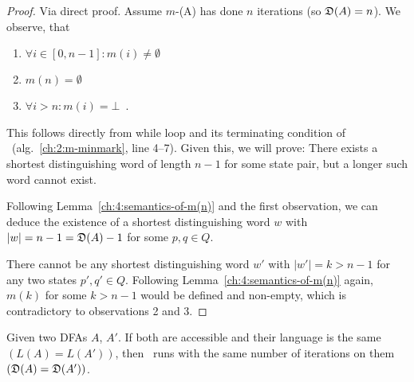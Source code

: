 \begin{proof}
	Via direct proof. Assume $m$-\CompDist(A) has done $n$ iterations (so $\mathfrak{D}(A) = n$). We observe, that
	\begin{enumerate}
		\item $\forall i \in [0,n-1]\colon m(i) \neq \emptyset$
		\item $m(n)= \emptyset$
		\item $\forall i > n\colon m(i)= \bot$\ .
	\end{enumerate}
	This follows directly from while loop and its terminating condition of \CompDist\ (alg.~\ref{ch:2:m-minmark}, line 4--7). Given this, we will prove: There exists a shortest distinguishing word of length $n-1$ for some state pair, but a longer such word cannot exist.

	
	Following Lemma~\ref{ch:4:semantics-of-m(n)} and the first observation, we can deduce the existence of a shortest distinguishing word $w$ with $|w| = n-1 = \mathfrak{D}(A)-1$ for some $p,q \in Q$.
	
	
	There cannot be any shortest distinguishing word $w'$ with $|w'| = k > n-1$ for any two states $p',q'\in Q$. Following Lemma~\ref{ch:4:semantics-of-m(n)} again, $m(k)$ for some $k > n-1$ would be defined and non-empty, which is contradictory to observations 2 and 3.
\end{proof}

\begin{theorem}\label{ch:4:th-D}
	Given two DFAs $A$, $A'$. If both are accessible and their language is the same $(L(A) = L(A'))$, then \CompDist\ runs with the same number of iterations on them $(\mathfrak{D}(A) = \mathfrak{D}(A'))$.
\end{theorem}


